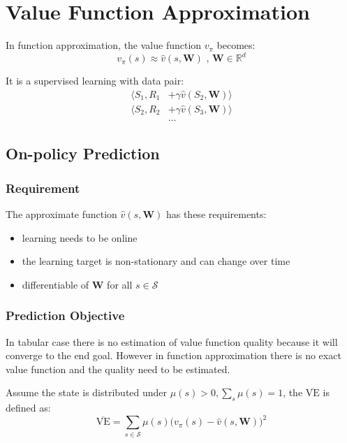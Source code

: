 \section{Value Function Approximation}

In function approximation, the value function $v_\pi$ becomes:
\begin{equation}
	v_\pi (s) \approx \widehat{v}(s, \mathbf{W}) \text{  ,  } \mathbf{W} \in \mathbb{R}^d
\end{equation}

It is a supervised learning with data pair:
\begin{equation}
	\begin{aligned}
		\langle S_1, R_1 &+ \gamma \widehat{v}(S_2, \mathbf{W}) \rangle \\
		\langle S_2, R_2 &+ \gamma \widehat{v}(S_3, \mathbf{W}) \rangle \\
		&\dots
	\end{aligned}
\end{equation}

\subsection{On-policy Prediction}

\subsubsection{Requirement}

The approximate function $\widehat{v}(s, \mathbf{W})$ has these requirements:
\begin{itemize}
	\item learning needs to be online
	\item the learning target is non-stationary and can change over time
	\item differentiable of $\mathbf{W}$ for all $s \in \mathcal{S}$
\end{itemize}

\subsubsection{Prediction Objective}

In tabular case there is no estimation of value function quality because it will converge to the end goal. However in function approximation there is no exact value function and the quality need to be estimated. 

Assume the state is distributed under $\mu(s)>0, \sum\limits_s \mu(s) = 1$, the  $\overline{\text{VE}}$ is defined as:
\begin{equation}
	\overline{\text{VE}} = \sum_{s \in \mathcal{S}} \mu (s) \Big ( v_\pi (s) - \widehat{v}(s,\mathbf{W}) \Big )^2
\end{equation}

